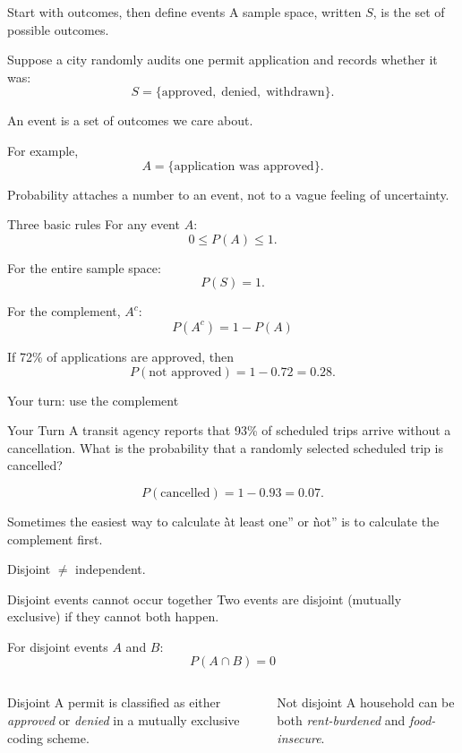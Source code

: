 \documentclass[11pt,aspectratio=169]{beamer}
\newcommand{\yourturn}[1]{%
\begin{center}
\begin{minipage}{0.90\textwidth}
\begin{alertblock}{Your Turn}
#1
\end{alertblock}
\end{minipage}
\end{center}}
\newcommand{\prob}[1]{P\!\left(#1\right)}
\begin{document}
\begin{frame}{Start with outcomes, then define events}
A \alert{sample space}, written $S$, is the set of possible outcomes.

\vspace{0.5em}
Suppose a city randomly audits one permit application and records whether it was:
\[
S=\{\text{approved},\;\text{denied},\;\text{withdrawn}\}.
\]

An \alert{event} is a set of outcomes we care about.

\vspace{0.5em}
For example,
\[
A=\{\text{application was approved}\}.
\]

\vfill
\alert{Probability attaches a number to an event, not to a vague feeling of uncertainty.}
\end{frame}

\begin{frame}{Three basic rules}
For any event $A$:
\[
0\leq \prob{A}\leq 1.
\]

For the entire sample space:
\[
\prob{S}=1.
\]

For the complement, $A^c$:
\[
\boxed{\prob{A^c}=1-\prob{A}}
\]

\vfill
If 72\% of applications are approved, then
\[
\prob{\text{not approved}}=1-0.72=0.28.
\]
\end{frame}

\begin{frame}{Your turn: use the complement}
\yourturn{A transit agency reports that 93\% of scheduled trips arrive without a cancellation. What is the probability that a randomly selected scheduled trip is cancelled?}

\vspace{0.8em}
\[
\prob{\text{cancelled}}=1-0.93=\boxed{0.07}.
\]

\vfill
Sometimes the easiest way to calculate \`\`at least one'' or \`\`not'' is to calculate the complement first.
\end{frame}

\begin{frame}[standout]
\Large Disjoint $\neq$ independent.
\end{frame}

\begin{frame}{Disjoint events cannot occur together}
Two events are \alert{disjoint} (mutually exclusive) if they cannot both happen.

\vspace{0.5em}
For disjoint events $A$ and $B$:
\[
\boxed{\prob{A\cap B}=0}
\]

\begin{columns}[T,onlytextwidth]
\begin{block}{Disjoint}
A permit is classified as either \emph{approved} or \emph{denied} in a mutually exclusive coding scheme.
\end{block}
\begin{block}{Not disjoint}
A household can be both \emph{rent-burdened} and \emph{food-insecure}.
\end{block}
\end{columns}
\end{frame}
\end{document}
